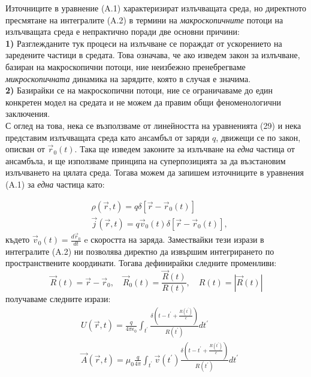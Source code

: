 \begin{appendices}
	Източниците в уравнение (A.1) характеризират излъчващата среда, но директното пресмятане на интегралите (A.2) в термини на \emph{макроскопичните} потоци на излъчващата среда е непрактично поради две основни причини:\\
	
	\textbf{1)} Разглежданите тук процеси на излъчване се пораждат от ускорението на заредените частици в средата. Това означава, че ако изведем закон за излъчване, базиран на макроскопични потоци, ние неизбежно пренебрегваме \emph{микроскопичната} динамика на зарядите, която в случая е значима.\\
	
	\textbf{2)} Базирайки се на макроскопични потоци, ние се ограничаваме до един конкретен модел на средата и не можем да правим общи феноменологични заключения.\\
	
	С оглед на това, нека се възползваме от линейността на уравненията (29) и нека представим излъчващата среда като ансамбъл от заряди $q$, движещи се по закон, описван от $\vec{r}_0(t)$. Така ще изведем законите за излъчване на \emph{една} частица от ансамбъла, и ще използваме принципа на суперпозицията за да възстановим излъчването на цялата среда. Тогава можем да запишем източниците в уравнения (A.1) за \emph{една} частица като:
	
	\begin{equation}
		\begin{split}
		&\rho(\vec{r},t) = q \delta\left[\vec{r} - \vec{r}_0(t)\right]\\
		&\vec{j}(\vec{r}, t) = q \vec{v}_0(t)\delta\left[\vec{r} - \vec{r}_0(t)\right],
		\end{split}
	\end{equation}
	където $\vec{v}_0(t) = \frac{d\vec{r}_0}{dt}$ e скоростта на заряда. Замествайки тези изрази в интегралите (A.2) ни позволява директно да извършим интегрирането по пространствените координати. Тогава дефинирайки следните променливи:
	\begin{equation}
		\vec{R}(t) = \vec{r} - \vec{r}_0, \quad \vec{R}_0(t) = \frac{\vec{R}(t)}{R(t)},\quad R(t) = |\vec{R}(t)|
	\end{equation}
	получаваме следните изрази:
	\begin{equation}
		\begin{split}
		&U(\vec{r},t) = \frac{q}{4\pi\epsilon_0}\int_{t^\prime}\frac{\delta\left(t - t^\prime + \frac{R(t^\prime)}{c}\right)}{R(t^\prime)}dt^\prime\\
		&\vec{A}(\vec{r},t) = \mu_0\frac{q}{4\pi}\int_{t^\prime}\vec{v}(t^\prime)\frac{\delta\left(t - t^\prime + \frac{R(t^\prime)}{c}\right)}{R(t^\prime)}dt^\prime\\
		\end{split}
	\end{equation}
	

\end{appendices}
